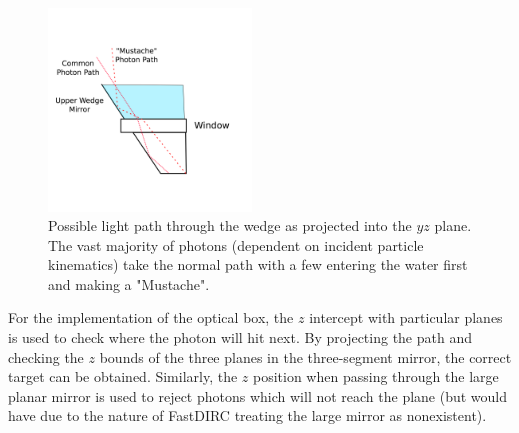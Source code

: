 \begin{figure}[!h]
\centering
\includegraphics[width=0.48\textwidth]{pics/wedge_paths.pdf}
\caption{Possible light path through the wedge as projected into the $yz$ plane.  The vast majority of photons (dependent on incident particle kinematics) take the normal path with a few entering the water first and making a "Mustache".}
\label{fig:wedge_paths}
\end{figure}

For the implementation of the \gluex optical box, the $z$ intercept with particular planes is used to check where the photon will hit next.  By projecting the path and checking the $z$ bounds of the three planes in the three-segment mirror, the correct target can be obtained.  Similarly, the $z$ position when passing through the large planar mirror is used to reject photons which will not reach the plane (but would have due to the nature of FastDIRC treating the large mirror as nonexistent).

